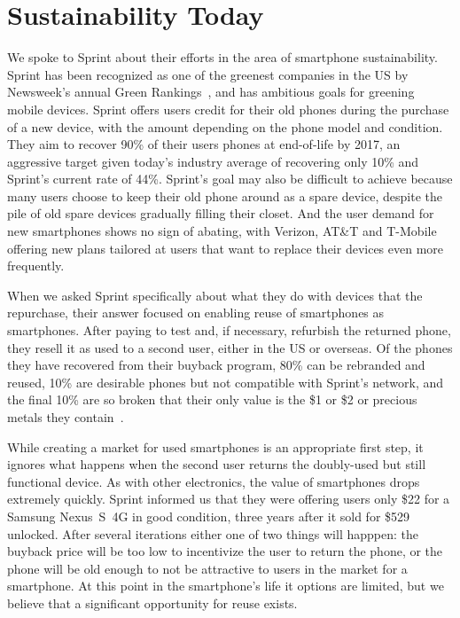 \section{Sustainability Today}
\label{sec-sustainability}

We spoke to Sprint about their efforts in the area of smartphone
sustainability. Sprint has been recognized as one of the greenest companies
in the US by Newsweek's annual Green Rankings~\cite{sprintgreen-url}, and has
ambitious goals for greening mobile devices. Sprint offers users credit for
their old phones during the purchase of a new device, with the amount
depending on the phone model and condition. They aim to recover 90\% of their
users phones at end-of-life by 2017, an aggressive target given today's
industry average of recovering only 10\% and Sprint's current rate of 44\%.
Sprint's goal may also be difficult to achieve because many users choose to
keep their old phone around as a spare device, despite the pile of old spare
devices gradually filling their closet. And the user demand for new
smartphones shows no sign of abating, with Verizon, AT\&T and T-Mobile
offering new plans tailored at users that want to replace their devices even
more frequently.

When we asked Sprint specifically about what they do with devices that the
repurchase, their answer focused on enabling reuse of smartphones as
smartphones. After paying to test and, if necessary, refurbish the returned
phone, they resell it as used to a second user, either in the US or overseas.
Of the phones they have recovered from their buyback program, 80\% can be
rebranded and reused, 10\% are desirable phones but not compatible with
Sprint's network, and the final 10\% are so broken that their only value is
the \$1 or \$2 or precious metals they contain~\cite{FIXME-goldinphone}.

While creating a market for used smartphones is an appropriate first step, it
ignores what happens when the second user returns the doubly-used but still
functional device. As with other electronics, the value of smartphones drops
extremely quickly. Sprint informed us that they were offering users only \$22
for a Samsung Nexus~S~4G in good condition, three years after it sold for
\$529 unlocked. After several iterations either one of two things will
happpen: the buyback price will be too low to incentivize the user to return
the phone, or the phone will be old enough to not be attractive to users in
the market for a smartphone. At this point in the smartphone's life it
options are limited, but we believe that a significant opportunity for reuse
exists.
